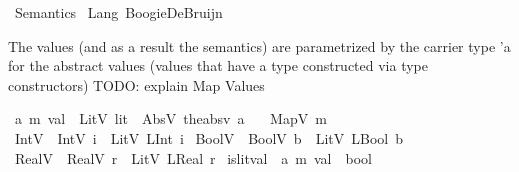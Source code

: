 %
\begin{isabellebody}%
%
%
\isadelimdocument
%
\endisadelimdocument
%
\isatagdocument
%
\isamarkuptrue%
%
\endisatagdocument
{\isafolddocument}%
%
\isadelimdocument
%
\endisadelimdocument
%
\isadelimtheory
%
\endisadelimtheory
%
\isatagtheory
{}\isamarkupfalse%
\ Semantics\isanewline
{}\ Lang\ BoogieDeBruijn\isanewline
{}%
\endisatagtheory
{\isafoldtheory}%
%
\isadelimtheory
%
\endisadelimtheory
%
\isadelimdocument
%
\endisadelimdocument
%
\isatagdocument
%
\isamarkuptrue%
%
\endisatagdocument
{\isafolddocument}%
%
\isadelimdocument
%
\endisadelimdocument
%
\begin{isamarkuptext}%
The values (and as a result the semantics) are parametrized by the carrier type 'a for the 
abstract values (values that have a type constructed via type constructors)
TODO: explain Map Values%
\end{isamarkuptext}\isamarkuptrue%
\isamarkupfalse%
\ {\isacharparenleft}{\kern0pt}{\isacharprime}{\kern0pt}a{\isacharcomma}{\kern0pt}\ {\isacharprime}{\kern0pt}m{\isacharparenright}{\kern0pt}\ val\ {\isacharequal}{\kern0pt}\ LitV\ lit\ {\isacharbar}{\kern0pt}\ AbsV\ {\isacharparenleft}{\kern0pt}the{\isacharunderscore}{\kern0pt}absv{\isacharcolon}{\kern0pt}\ {\isacharprime}{\kern0pt}a{\isacharparenright}{\kern0pt}\isanewline
\ \ {\isacharbar}{\kern0pt}\ MapV\ {\isacharprime}{\kern0pt}m\isanewline
\ \ \isanewline
{}\isamarkupfalse%
\ IntV\ \ {\isachardoublequoteopen}IntV\ i\ {\isasymequiv}\ LitV\ {\isacharparenleft}{\kern0pt}LInt\ i{\isacharparenright}{\kern0pt}{\isachardoublequoteclose}\isanewline
{}\isamarkupfalse%
\ BoolV\ \ {\isachardoublequoteopen}BoolV\ b\ {\isasymequiv}\ LitV\ {\isacharparenleft}{\kern0pt}LBool\ b{\isacharparenright}{\kern0pt}{\isachardoublequoteclose}\isanewline
{}\isamarkupfalse%
\ RealV\ \ {\isachardoublequoteopen}RealV\ r\ {\isasymequiv}\ LitV\ {\isacharparenleft}{\kern0pt}LReal\ r{\isacharparenright}{\kern0pt}{\isachardoublequoteclose}\isanewline
\isanewline
\isanewline
{}\isamarkupfalse%
\ is{\isacharunderscore}{\kern0pt}lit{\isacharunderscore}{\kern0pt}val\ {\isacharcolon}{\kern0pt}{\isacharcolon}{\kern0pt}\ {\isachardoublequoteopen}{\isacharparenleft}{\kern0pt}{\isacharprime}{\kern0pt}a{\isacharcomma}{\kern0pt}\ {\isacharprime}{\kern0pt}m{\isacharparenright}{\kern0pt}\ val\ {\isasymRightarrow}\ bool{\isachardoublequoteclose}\isanewline

\end{isabellebody}
